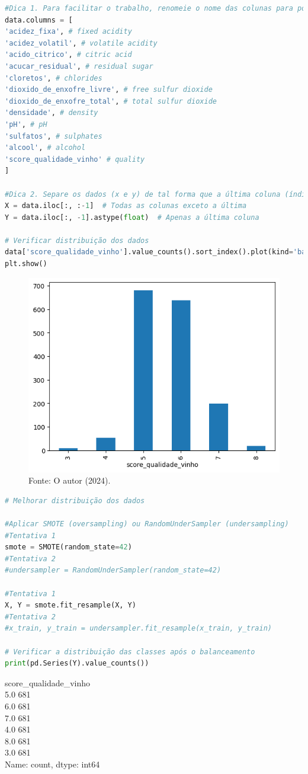 \begin{lstlisting}[language=Python, style=input]
#Dica 1. Para facilitar o trabalho, renomeie o nome das colunas para português, dessa forma:
data.columns = [
'acidez_fixa', # fixed acidity
'acidez_volatil', # volatile acidity
'acido_citrico', # citric acid
'acucar_residual', # residual sugar
'cloretos', # chlorides
'dioxido_de_enxofre_livre', # free sulfur dioxide
'dioxido_de_enxofre_total', # total sulfur dioxide
'densidade', # density
'pH', # pH
'sulfatos', # sulphates
'alcool', # alcohol
'score_qualidade_vinho' # quality
]

#Dica 2. Separe os dados (x e y) de tal forma que a última coluna (índice -1), chamada score_qualidade_vinho, seja a variável target (y)
X = data.iloc[:, :-1]  # Todas as colunas exceto a última
Y = data.iloc[:, -1].astype(float)  # Apenas a última coluna

# Verificar distribuição dos dados
data['score_qualidade_vinho'].value_counts().sort_index().plot(kind='bar')
plt.show()
\end{lstlisting}
\begin{figure}[H]
\centering
\caption{Distribuição dos dados - Wine quality}
\includegraphics[width=.8\linewidth]{apendices/fig/13_IAA012_5.png}
\caption*{Fonte: O autor (2024).}
\end{figure}
\begin{lstlisting}[language=Python, style=input]
# Melhorar distribuição dos dados

#Aplicar SMOTE (oversampling) ou RandomUnderSampler (undersampling)
#Tentativa 1
smote = SMOTE(random_state=42)
#Tentativa 2
#undersampler = RandomUnderSampler(random_state=42)

#Tentativa 1
X, Y = smote.fit_resample(X, Y)
#Tentativa 2
#x_train, y_train = undersampler.fit_resample(x_train, y_train)

# Verificar a distribuição das classes após o balanceamento
print(pd.Series(Y).value_counts())
\end{lstlisting}
\begin{tcolorbox}[myoutputstyle]
score\_qualidade\_vinho\\
5.0    681\\
6.0    681\\
7.0    681\\
4.0    681\\
8.0    681\\
3.0    681\\
Name: count, dtype: int64
\end{tcolorbox}
